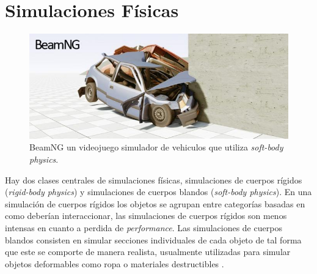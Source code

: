\section{Simulaciones Físicas}
\setlength\intextsep{0pt}
\begin{figure}
\includegraphics[width=\linewidth]{media/beamng_gamephysics.jpg}
\caption{BeamNG un videojuego simulador de vehiculos que utiliza \emph{soft-body physics}.}
\label{fig:beamng}
\end{figure}
Hay dos clases centrales de simulaciones físicas, simulaciones de cuerpos rígidos (\emph{rigid-body physics}) y simulaciones de cuerpos blandos (\emph{soft-body physics}). En una simulación de cuerpos rígidos los objetos se agrupan entre categorías basadas en como deberían interaccionar, las simulaciones de cuerpos rígidos son menos intensas en cuanto a perdida de \emph{performance}. Las simulaciones de cuerpos blandos consisten en simular secciones individuales de cada objeto de tal forma que este se comporte de manera realista, usualmente utilizadas para simular objetos deformables como ropa o materiales destructibles \cite{ian_gamephysics}.
